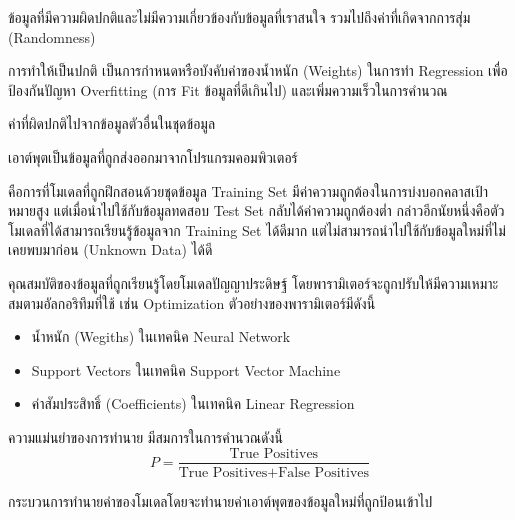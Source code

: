 \begin{description}[style=nextline]
    \item[Noise] ข้อมูลที่มีความผิดปกติและไม่มีความเกี่ยวข้องกับข้อมูลที่เราสนใจ รวมไปถึงค่าที่เกิดจากการสุ่ม (Randomness)

    \item[Normalization] การทำให้เป็นปกติ เป็นการกำหนดหรือบังคับค่าของน้ำหนัก (Weights) ในการทำ Regression เพื่อป้องกันปัญหา
    Overfitting (การ Fit ข้อมูลที่ดีเกินไป) และเพิ่มความเร็วในการคำนวณ

    \item[Outlier] ค่าที่ผิดปกติไปจากข้อมูลตัวอื่นในชุดข้อมูล

    \item[Output] เอาต์พุตเป็นข้อมูลที่ถูกส่งออกมาจากโปรแกรมคอมพิวเตอร์

    \item[Overfitting] คือการที่โมเดลที่ถูกฝึกสอนด้วยชุดข้อมูล Training Set มีค่าความถูกต้องในการบ่งบอกคลาสเป้าหมายสูง 
    แต่เมื่อนำไปใช้กับข้อมูลทดสอบ Test Set กลับได้ค่าความถูกต้องต่ำ กล่าวอีกนัยหนึ่งคือตัวโมเดลที่ได้สามารถเรียนรู้ข้อมูลจาก Training Set 
    ได้ดีมาก แต่ไม่สามารถนำไปใช้กับข้อมูลใหม่ที่ไม่เคยพบมาก่อน (Unknown Data) ได้ดี

    \item[Parameter] คุณสมบัติของข้อมูลที่ถูกเรียนรู้โดยโมเดลปัญญาประดิษฐ์ โดยพารามิเตอร์จะถูกปรับให้มีความเหมาะสมตามอัลกอริทึมที่ใช้
    เช่น Optimization ตัวอย่างของพารามิเตอร์มีดังนี้
    \begin{itemize}
        \item น้ำหนัก (Wegiths) ในเทคนิค Neural Network
        
        \item Support Vectors ในเทคนิค Support Vector Machine
        
        \item ค่าสัมประสิทธิ์ (Coefficients) ในเทคนิค Linear Regression
    \end{itemize}

    \item[Precision] ความแม่นยำของการทำนาย มีสมการในการคำนวณดังนี้
    \begin{equation}\label{eq:precision}
        P = \frac{\text{True Positives}}{\text{True Positives} + \text{False Positives}}
    \end{equation}

    \item[Prediction] กระบวนการทำนายค่าของโมเดลโดยจะทำนายค่าเอาต์พุตของข้อมูลใหม่ที่ถูกป้อนเข้าไป


\end{description}
